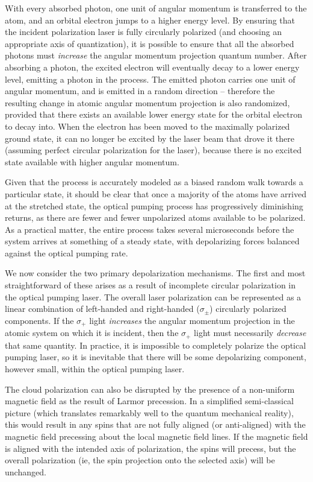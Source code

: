 With every absorbed photon, one unit of angular momentum is transferred to the atom, and an orbital electron jumps to a higher energy level.  By ensuring that the incident polarization laser is fully circularly polarized (and choosing an appropriate axis of quantization), it is possible to ensure that all the absorbed photons must \emph{increase} the angular momentum projection quantum number.  After absorbing a photon, the excited electron will eventually decay to a lower energy level, emitting a photon in the process.  The emitted photon carries one unit of angular momentum, and is emitted in a random direction -- therefore the resulting change in atomic angular momentum projection is also randomized, provided that there exists an available lower energy state for the orbital electron to decay into.   When the electron has been moved to the maximally polarized ground state, it can no longer be excited by the laser beam that drove it there (assuming perfect circular polarization for the laser), because there is no excited state available with higher angular momentum.  

Given that the process is accurately modeled as a biased random walk towards a particular state, it should be clear that once a majority of the atoms have arrived at the stretched state, the optical pumping process has progressively diminishing returns, as there are fewer and fewer unpolarized atoms available to be polarized.  As a practical matter, the entire process takes several microseconds before the system arrives at something of a steady state, with depolarizing forces balanced against the optical pumping rate.

We now consider the two primary depolarization mechanisms.  The first and most straightforward of these arises as a result of incomplete circular polarization in the optical pumping laser.  The overall laser polarization can be represented as a linear combination of left-handed and right-handed ($\sigma_{\pm}$) circularly polarized components.  If the $\sigma_{+}$ light \emph{increases} the angular momentum projection in the atomic system on which it is incident, then the $\sigma_{+}$ light must necessarily \emph{decrease} that same quantity.  In practice, it is impossible to completely polarize the optical pumping laser, so it is inevitable that there will be some depolarizing component, however small, within the optical pumping laser.

The cloud polarization can also be disrupted by the presence of a non-uniform magnetic field as the result of Larmor precession.  In a simplified semi-classical picture (which translates remarkably well to the quantum mechanical reality), this would result in any spins that are not fully aligned (or anti-aligned) with the magnetic field precessing about the local magnetic field lines.  If the magnetic field is aligned with the intended axis of polarization, the spins will precess, but the overall polarization (ie, the spin projection onto the selected axis) will be unchanged.  

